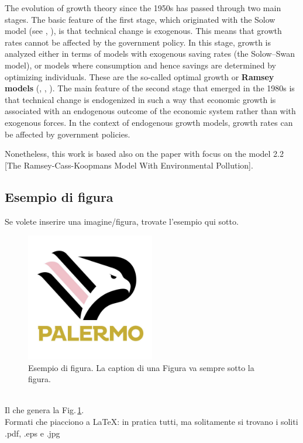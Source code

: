 The evolution of growth theory since the 1950s has passed through two main stages. The basic feature of the first stage, which originated with the Solow model (see \cite[Solow]{solow_contribution_1956}, \cite[Swan]{swan_economic_1956}), is that technical change is exogenous. This means that growth rates cannot be affected by the government policy. In this stage, growth is analyzed either in terms of models with exogenous saving rates (the Solow–Swan model), or models where consumption and hence savings are determined by optimizing individuals. These are the so-called optimal growth or \textbf{Ramsey models} (\cite[Ramsey]{ramsey_mathematical_1928}, \cite[Cass]{cass_optimum_1965}, \cite[Koopmans]{koopmans_concept_1963}). The main feature of the second stage that emerged in the 1980s is that technical change is endogenized in such a way that economic growth is associated with an endogenous
outcome of the economic system rather than with exogenous forces. In the context of endogenous growth models, growth rates can be affected by government policies.


Nonetheless, this work is based also on the paper \cite{caravaggio_nonlinear_2018} with focus on the model 2.2 [The Ramsey-Cass-Koopmans Model With Environmental Pollution].

\subsection{Esempio di figura}\label{subsec:esempio_figura}
Se volete inserire una imagine/figura, trovate l'esempio qui sotto.
\begin{figure}[h]
    \centering
    \includegraphics[width=0.5\textwidth]{Figure/esempio.jpg}
    \caption{Esempio di figura. La caption di una Figura va sempre sotto la figura.}
    \label{fig:esempio_fig}
\end{figure}\\
Il che genera la Fig.\,\ref{fig:esempio_fig}.\\
Formati che piacciono a LaTeX: in pratica tutti, ma solitamente si trovano i soliti .pdf, .eps e .jpg
\cite[Chap 12]{Liptser-S-77}

